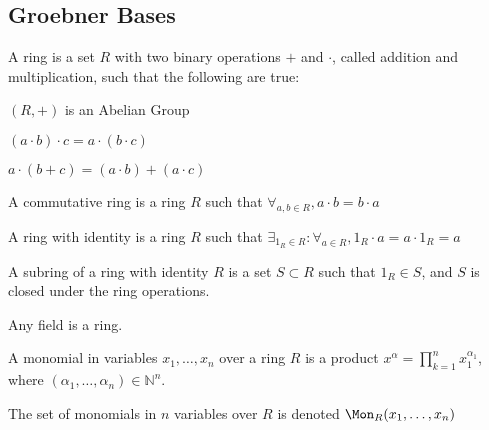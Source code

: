         \subsection{Groebner Bases}
            \begin{definition}
                A ring is a set $R$ with two binary operations $+$
                and $\cdot$, called addition and multiplication,
                such that the following are true:
                \begin{enumerate}
                    \begin{multicols}{3}
                        \item $(R,+)$ is an Abelian Group
                        \item $(a\cdot{b})\cdot{c}=a\cdot(b\cdot{c})$
                        \item $a\cdot(b+c)=(a\cdot b)+(a\cdot c)$
                    \end{multicols}
                \end{enumerate}
            \end{definition}
            \begin{definition}
                A commutative ring is a ring $R$ such that
                $\forall_{a,b\in R},a\cdot{b}=b\cdot{a}$
            \end{definition}
            \begin{definition}
                A ring with identity is a ring $R$ such that
                $\exists_{1_{R}\in R}:\forall_{a\in R}, 1_{R}\cdot a=a\cdot 1_{R}=a$
            \end{definition}
            \begin{definition}
                A subring of a ring with identity $R$ is a set
                $S\subset R$ such that $1_{R}\in S$, and $S$ is
                closed under the ring operations.
            \end{definition}
            \begin{remark}
                Any field is a ring.
            \end{remark}
            \begin{definition}
                A monomial in variables $x_1,\hdots, x_n$ over a
                ring $R$ is a product
                $x^\alpha=\prod_{k=1}^{n} x_1^{\alpha_1}$,
                where $(\alpha_1,\hdots,\alpha_n)\in \mathbb{N}^n$.
            \end{definition}
            \begin{notation}
                The set of monomials in $n$ variables over
                $R$ is denoted $\Mon_{R}(x_1,\hdots, x_n)$
            \end{notation}
